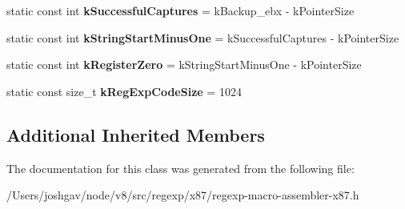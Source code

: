 \begin{DoxyCompactItemize}
\item 
static const int {\bfseries k\+Successful\+Captures} = k\+Backup\+\_\+ebx -\/ k\+Pointer\+Size\hypertarget{classv8_1_1internal_1_1_reg_exp_macro_assembler_x87_a54058cfcf57af75e35ec41e96ea9a477}{}\label{classv8_1_1internal_1_1_reg_exp_macro_assembler_x87_a54058cfcf57af75e35ec41e96ea9a477}

\item 
static const int {\bfseries k\+String\+Start\+Minus\+One} = k\+Successful\+Captures -\/ k\+Pointer\+Size\hypertarget{classv8_1_1internal_1_1_reg_exp_macro_assembler_x87_abf8e5696822402bfc64c8a104dbe1f65}{}\label{classv8_1_1internal_1_1_reg_exp_macro_assembler_x87_abf8e5696822402bfc64c8a104dbe1f65}

\item 
static const int {\bfseries k\+Register\+Zero} = k\+String\+Start\+Minus\+One -\/ k\+Pointer\+Size\hypertarget{classv8_1_1internal_1_1_reg_exp_macro_assembler_x87_a601b8615bc2d7cff6e1faa8943838cc2}{}\label{classv8_1_1internal_1_1_reg_exp_macro_assembler_x87_a601b8615bc2d7cff6e1faa8943838cc2}

\item 
static const size\+\_\+t {\bfseries k\+Reg\+Exp\+Code\+Size} = 1024\hypertarget{classv8_1_1internal_1_1_reg_exp_macro_assembler_x87_a21896625100b5856b9d038c685be57d3}{}\label{classv8_1_1internal_1_1_reg_exp_macro_assembler_x87_a21896625100b5856b9d038c685be57d3}

\end{DoxyCompactItemize}
\subsection*{Additional Inherited Members}


The documentation for this class was generated from the following file\+:\begin{DoxyCompactItemize}
\item 
/\+Users/joshgav/node/v8/src/regexp/x87/regexp-\/macro-\/assembler-\/x87.\+h\end{DoxyCompactItemize}
